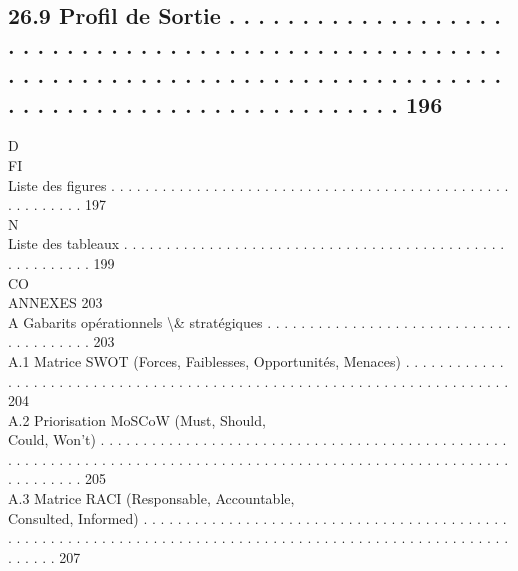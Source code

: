 \documentclass[12pt,landscape,a4paper]{article}
\begin{document}
\subsection{26.9    Profil de Sortie . . . . . . . . . . . . . . . . . . . . . . . . . . . . . . . . . . . . . . . . . . . . . . . . . . . . . . . . . . . . . . . . . . . . . . . . . . . . . . . . . . . . . . . . . . . . . . . . . . . . . . . . . . . . . . . . . . 196}
\vspace{0.5em}
\vspace{0.5em}
\vspace{0.5em}
\vspace{0.5em}
D\\
FI\\
Liste des figures . . . . . . . . . . . . . . . . . . . . . . . . . . . . . . . . . . . . . . . . . . . . . . . . . . . . . . . . 197\\
\vspace{0.5em}
N\\
Liste des tableaux . . . . . . . . . . . . . . . . . . . . . . . . . . . . . . . . . . . . . . . . . . . . . . . . . . . . . . . 199\\
CO\\
ANNEXES                                                                                                                                                                                                                                                      203\\
A     Gabarits opérationnels \textbackslash{}& stratégiques . . . . . . . . . . . . . . . . . . . . . . . . . . . . . . . . . . . . . . . 203\\
A.1     Matrice SWOT (Forces, Faiblesses, Opportunités, Menaces) . . . . . . . . . . . . . . . . . . . . . . . . . . . . . . . . . . . . . . . . . . . . . . . . . . . . . . . . . . . . . . . . . . . . . . . 204\\
A.2     Priorisation MoSCoW (Must, Should,\\
Could, Won’t) . . . . . . . . . . . . . . . . . . . . . . . . . . . . . . . . . . . . . . . . . . . . . . . . . . . . . . . . . . . . . . . . . . . . . . . . . . . . . . . . . . . . . . . . . . . . . . . . . . . . . . . . . . . . . . . . . . . . 205\\
A.3     Matrice RACI (Responsable, Accountable,\\
Consulted, Informed) . . . . . . . . . . . . . . . . . . . . . . . . . . . . . . . . . . . . . . . . . . . . . . . . . . . . . . . . . . . . . . . . . . . . . . . . . . . . . . . . . . . . . . . . . . . . . . . . . . . . . . . . . . . . 207\\
\end{document}
